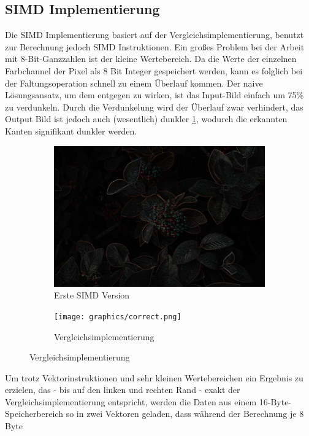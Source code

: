\documentclass[course=erap]{aspdoc}
\begin{document}
\subsection{SIMD Implementierung}
\label{sec:simd-implementierung}
Die SIMD Implementierung basiert auf der Vergleichsimplementierung, benutzt zur Berechnung jedoch SIMD Instruktionen.
Ein großes Problem bei der Arbeit mit 8-Bit-Ganzzahlen ist der kleine Wertebereich.
Da die Werte der einzelnen Farbchannel der Pixel als 8 Bit Integer gespeichert werden, kann es folglich bei der Faltungsoperation schnell zu einem Überlauf kommen.
Der naive Lösungsansatz, um dem entgegen zu wirken, ist das Input-Bild einfach um 75\% zu verdunkeln.
Durch die Verdunkelung wird der Überlauf zwar verhindert, das Output Bild ist jedoch auch (wesentlich) dunkler {\ref{fig:dark}}, wodurch die erkannten Kanten signifikant dunkler werden.
\begin{figure}[H]
    \begin{subfigure}{.5\columnwidth}
        \centering
        \includegraphics[width=\columnwidth]{graphics/dark.png}
        \caption{Erste SIMD Version}
        \label{fig:dark}
    \end{subfigure}
    \begin{subfigure}{.5\columnwidth}
        \centering
        \texttt{[image: graphics/correct.png]}
        \caption{Vergleichsimplementierung}
        \label{fig:correct}
    \end{subfigure}
\end{figure}
Um trotz Vektorinstruktionen und sehr kleinen Wertebereichen ein Ergebnis zu erzielen,
das - bis auf den linken und rechten Rand - exakt der Vergleichsimplementierung entspricht,
werden die Daten aus einem 16-Byte-Speicherbereich so in zwei Vektoren geladen, dass während der Berechnung je 8 Byte
\end{document}
